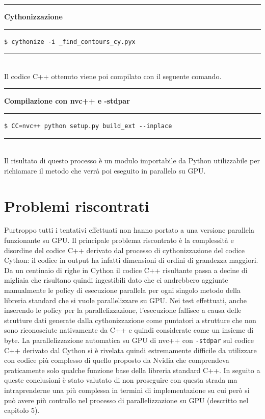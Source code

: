 \documentclass[12pt,a4paper]{report}
\begin{document}
\noindent\rule[0.5ex]{\linewidth}{2pt}
\small{\textbf{Cythonizzazione}} \\
\noindent\rule[0.5ex]{\linewidth}{1pt}
\begin{lstlisting}
$ cythonize -i _find_contours_cy.pyx
\end{lstlisting}
\noindent\rule[0.5ex]{\linewidth}{1pt} \\[8pt]
Il codice C++ ottenuto viene poi compilato con il seguente comando.\\[8pt]
\noindent\rule[0.5ex]{\linewidth}{2pt}
\small{\textbf{Compilazione con nvc++ e -stdpar}} \\
\noindent\rule[0.5ex]{\linewidth}{1pt}
\begin{lstlisting}
$ CC=nvc++ python setup.py build_ext --inplace
\end{lstlisting}
\noindent\rule[0.5ex]{\linewidth}{1pt} \\[10pt]
Il risultato di questo processo è un modulo importabile da Python utilizzabile per richiamare il metodo che verrà poi eseguito in parallelo su GPU. \newline 

\section{Problemi riscontrati}
Purtroppo tutti i tentativi effettuati non hanno portato a una versione parallela funzionante su GPU. Il principale problema riscontrato è la complessità e disordine del codice C++ derivato dal processo di cythonizzazione del codice Cython: il codice in output ha infatti dimensioni di ordini di grandezza maggiori. Da un centinaio di righe in Cython il codice C++ risultante passa a decine di migliaia che risultano quindi ingestibili dato che ci andrebbero aggiunte manualmente le policy di esecuzione parallela per ogni singolo metodo della libreria standard che si vuole parallelizzare su GPU. Nei test effettuati, anche inserendo le policy per la parallelizzazione, l'esecuzione fallisce a causa delle strutture dati generate dalla cythonizzazione come puntatori a strutture che non sono riconosciute nativamente da C++ e quindi considerate come un insieme di byte. La parallelizzazione automatica su GPU di nvc++ con \verb|-stdpar| sul codice C++ derivato dal Cython si è rivelata quindi estremamente difficile da utilizzare con codice più complesso di quello proposto da Nvidia che comprendeva praticamente solo qualche funzione base della libreria standard C++. 
In seguito a queste conclusioni è stato valutato di non proseguire con questa strada ma intraprenderne una più complessa in termini di implementazione su cui però si può avere più controllo nel processo di parallelizzazione su GPU (descritto nel capitolo 5).
\end{document}
